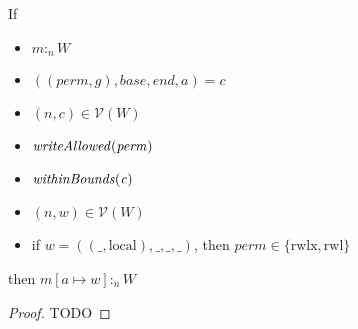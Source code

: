 \documentclass[a4paper]{article}
\newcommand{\update}[2]{[#1 \mapsto #2]}
\newcommand{\var}[1]{\mathit{#1}}
\newcommand{\gl}{\var{g}}
\newcommand{\addr}{\var{a}}
\newcommand{\start}{\var{base}}
\newcommand{\addrend}{\var{end}}
\newcommand{\heap}{\var{mem}}
\newcommand{\perm}{\var{perm}}
\newcommand{\plainfun}[2]{
  \ifthenelse{\equal{#2}{}}
  {\mathit{#1}}
  {\mathit{#1}(#2)}
}
\newcommand{\writeAllowed}[1]{\plainfun{writeAllowed}{#1}}
\newcommand{\withinBounds}[1]{\plainfun{withinBounds}{#1}}
\newcommand{\heapSat}[3][\heap]{#1 :_{#2} #3}
\newcommand{\asmType}{\plaindom{AsmType}}
\newcommand{\plaindom}[1]{\mathrm{#1}}
\newcommand{\intr}[2]{\mathcal{#1}}
\newcommand{\valueintr}[1]{\intr{V}{#1}}
\newcommand{\stdvr}{\valueintr{\asmType}}
\newcommand{\npair}[2][n]{\left(#1,#2 \right)}
\newcommand{\plainperm}[1]{\mathrm{#1}}
\newcommand{\readwritel}{\plainperm{rwl}}
\newcommand{\rwlx}{\plainperm{rwlx}}
\newcommand{\local}{\plainperm{local}}
\begin{document}
 
 \begin{lemma}
   \label{lem:conds-store-suff}
   If 
   \begin{itemize}
   \item $\heapSat[m]{n}{W}$
   \item $((\perm,\gl),\start,\addrend,\addr) = c$
   \item $\npair{c}\in\stdvr(W)$
   \item $\writeAllowed{\perm}$
   \item $\withinBounds{\var{c}}$
   \item $\npair{\var{w}}\in\stdvr(W)$
   \item if $\var{w} = ((\_,\local),\_,\_,\_)$, then $\perm \in
     \{\rwlx,\readwritel \}$
   \end{itemize}
 
   then $\heapSat[{m\update{\addr}{\var{w}}}]{n}{W}$
 \end{lemma}
 \begin{proof}
   TODO
 \end{proof}
  
\end{document}
